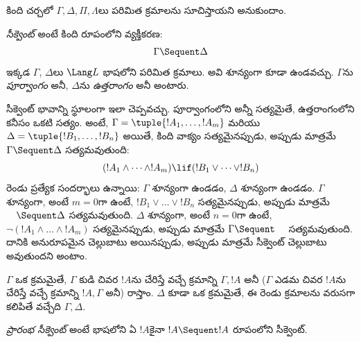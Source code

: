 \documentclass[../../../include/open-logic-section]{subfiles}
\begin{document}
      {}
      {}


కింది చర్చలో $\Gamma, \Delta, \Pi, \Lambda$లు 
పరిమిత క్రమాలను సూచిస్తాయని అనుకుందాం.

\begin{defn}[సీక్వెంట్]
\emph{సీక్వెంట్} అంటే కింది రూపంలోని వ్యక్తీకరణ:
\[
\Gamma \Sequent \Delta
\]
ఇక్కడ $\Gamma$, $\Delta$లు $\Lang L$ భాషలోని 
పరిమిత క్రమాలు. అవి శూన్యంగా కూడా ఉండవచ్చు. $\Gamma$ను \emph{పూర్వాంగం}
అనీ, $\Delta$ను \emph{ఉత్తరాంగం} అనీ అంటారు.
\end{defn}

\begin{explain}
సీక్వెంట్ భావాన్ని స్థూలంగా ఇలా చెప్పవచ్చు. పూర్వాంగంలోని 
అన్నీ సత్యమైతే, ఉత్తరాంగంలోని  కనీసం ఒకటి సత్యం.
అంటే, $\Gamma = \tuple{!A_1, \dots, !A_m}$ మరియు
$\Delta = \tuple{!B_1, \dots, !B_n}$ అయితే, కింది వాక్యం
సత్యమైనప్పుడు, అప్పుడు మాత్రమే $\Gamma \Sequent \Delta$ సత్యమవుతుంది:
\[
(!A_1 \land \cdots \land !A_m) \lif (!B_1 \lor \cdots \lor
!B_n)
\]
రెండు ప్రత్యేక సందర్భాలు ఉన్నాయి: $\Gamma$ శూన్యంగా ఉండడం,
$\Delta$ శూన్యంగా ఉండడం. $\Gamma$ శూన్యంగా, అంటే $m = 0$గా ఉంటే,
$!B_1 \lor \dots \lor !B_n$ సత్యమైనప్పుడు, అప్పుడు మాత్రమే $\quad
\Sequent \Delta$ సత్యమవుతుంది. $\Delta$ శూన్యంగా, అంటే $n = 0$గా
ఉంటే, $\lnot(!A_1 \land \dots \land !A_m)$ సత్యమైనప్పుడు, అప్పుడు
మాత్రమే $\Gamma \Sequent \quad$ సత్యమవుతుంది. దానికి అనురూపమైన
 చెల్లుబాటు అయినప్పుడు, అప్పుడు మాత్రమే సీక్వెంట్ చెల్లుబాటు అవుతుందని అంటాం.
\end{explain}

$\Gamma$ ఒక  క్రమమైతే, $\Gamma$ కుడి చివర $!A$ను
చేరిస్తే వచ్చే క్రమాన్ని $\Gamma, !A$ అనీ ($\Gamma$ ఎడమ చివర $!A$ను
చేరిస్తే వచ్చే క్రమాన్ని $!A, \Gamma$ అనీ) రాస్తాం. $\Delta$ కూడా ఒక
 క్రమమైతే, ఈ రెండు క్రమాలను వరుసగా కలిపితే వచ్చేది $\Gamma, \Delta$.

\begin{defn}[ప్రారంభ సీక్వెంట్]
\emph{ప్రారంభ సీక్వెంట్} అంటే
{భాషలోని ఏ  $!A$కైనా $!A \Sequent !A$ రూపంలోని
సీక్వెంట్}.
\end{defn}
\end{document}
